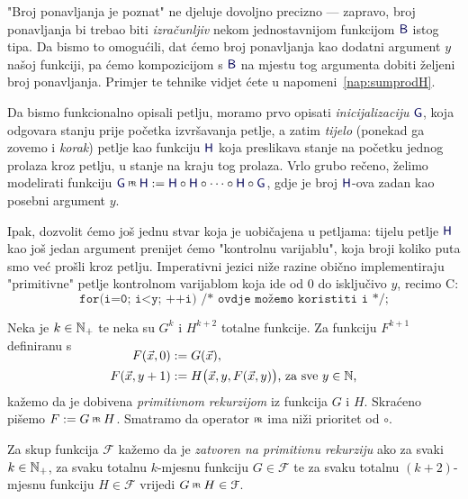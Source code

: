 "Broj ponavljanja je poznat" ne djeluje dovoljno precizno --- zapravo, broj ponavljanja bi trebao biti \emph{izračunljiv} nekom jednostavnijom funkcijom $\f B$ istog tipa. 
Da bismo to omogućili, dat ćemo broj ponavljanja kao dodatni argument $y$ našoj funkciji, pa ćemo kompozicijom s $\f B$ na mjestu tog argumenta dobiti željeni broj ponavljanja. Primjer te tehnike vidjet ćete u napomeni~\ref{nap:sumprodH}.

Da bismo funkcionalno opisali petlju, moramo prvo opisati \emph{inicijalizaciju} $\f G$, koja odgovara stanju prije početka izvršavanja petlje, a zatim \emph{tijelo} (ponekad ga zovemo i \emph{korak}) petlje kao funkciju $\f H$ koja preslikava stanje na početku jednog prolaza kroz petlju, u stanje na kraju tog prolaza. Vrlo grubo rečeno, želimo modelirati funkciju $\f G\pr\f H:=\f H\circ\f H\circ\dotsb\circ\f  H\circ\f G$, gdje je broj $\f H$-ova zadan kao posebni argument $y$.

Ipak, dozvolit ćemo još jednu stvar koja je uobičajena u petljama: tijelu petlje $\f H$ kao još jedan argument prenijet ćemo "kontrolnu varijablu", koja broji koliko puta smo već prošli kroz petlju. Imperativni jezici niže razine obično implementiraju "primitivne" petlje kontrolnom varijablom koja ide od $0$ do isključivo $y$, recimo C:
\begin{equation}\label{prog:Cprloop}
\texttt{for(i=0; i<y; ++i) /* ovdje možemo koristiti i */;}
\end{equation}


\begin{definicija}[{name=[primitivna rekurzija]}]\label{def:pr}
Neka je $k\in{\mathbb N}_+$ te neka su $G^k$ i $H^{k+2}$ totalne funkcije. Za funkciju $F^{k+1}$ definiranu s
\begin{align}
\SwapAboveDisplaySkip
\label{eq:defprb}
F(\vec x,0)&:=G(\vec x)\text,\\
\label{eq:defprk}
F(\vec x,y+1)&:=H\bigl(\vec x,y,F(\vec x,y)\bigr)\text{, za sve $y\in\N$,}
\end{align}
kažemo da je dobivena \emph{primitivnom rekurzijom} iz funkcija $G$ i $H$. Skraćeno pišemo $F:=G\pr H$. Smatramo da operator $\pr$ ima niži prioritet od $\circ$.

Za skup funkcija $\mathcal F$ kažemo da je \emph{zatvoren na primitivnu rekurziju} ako za svaki $k\in{\mathbb N}_+$, za svaku totalnu $k$-mjesnu funkciju $G\in\mathcal F$ te za svaku totalnu $(k+2)$-mjesnu funkciju $H\in\mathcal F$ vrijedi $G\pr H\in\mathcal F$.
\end{definicija}

